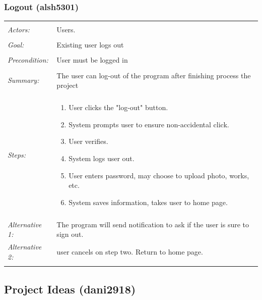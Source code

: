 \documentclass[11pt]{report}
\begin{document}
\subsubsection{Logout (alsh5301)}
\begin{tabular}{ p{2cm} p{12cm} }
 \hline
 \\
 \textit{Actors:} & Users. \\ 
  \\
 \textit{Goal:} & Existing user logs out \\ 
 \\
 \textit{Precondition:} & User must be logged in \\
 \\
 \textit{Summary:}  & The user can log-out of the program after finishing process the project  \\
 \\
 \textit{Steps:} & \begin{enumerate}
 \item User clicks the "log-out" button. 
 \item System prompts user to ensure non-accidental click. 
 \item User verifies. 
 \item System logs user out. 
 \item User enters password, may choose to upload photo, works, etc. 
 \item System saves information, takes user to home page.
 \end{enumerate} \\
\\
  \textit{Alternative 1:} & The program will send notification to ask if the user is sure to sign out. \\
  \textit{Alternative 2:} & user cancels on step two. Return to home page. \\ 
 \\
\hline
\end{tabular}



\subsection{Project Ideas (dani2918)}
\end{document}
